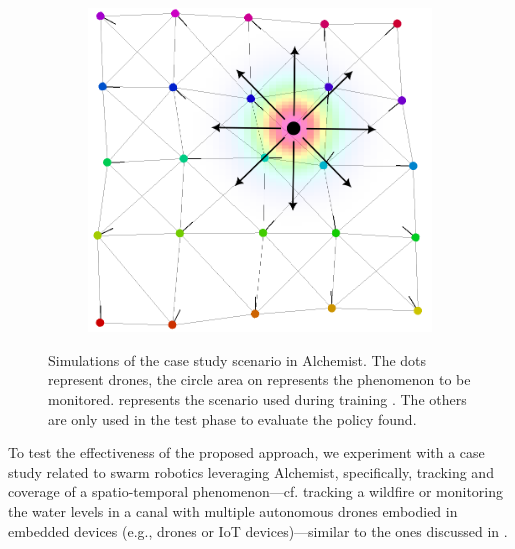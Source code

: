 \begin{figure}
\begin{subfigure}[b]{0.32\linewidth}
      \caption{}
      \label{acsos2023:fig:two}
  \end{subfigure}
  \begin{subfigure}[b]{0.32\linewidth}
      \includegraphics[width=\textwidth]{papers/acsos2023/imgs/example-moving.png}
      \caption{}
      \label{acsos2023:fig:moving}
  \end{subfigure}

 
  \caption[Simulations of the case study scenario in Alchemist for \ac{FIRL}.]{Simulations of the case study scenario in Alchemist. 
  The dots represent drones, 
  the circle area on represents the phenomenon to be monitored.
   represents the scenario used during training . 
  The others  are only used in the test phase to evaluate the policy found. }
  \label{acsos2023:fig:scenarios}
\end{figure}
To test the effectiveness of the proposed approach, 
 we experiment with a case study related to swarm robotics leveraging Alchemist, 
 specifically, tracking and coverage of a spatio-temporal phenomenon---cf. tracking a wildfire 
 or monitoring the water levels in a canal with multiple autonomous drones embodied in embedded devices (e.g., drones or IoT devices)---similar to the ones discussed in . 
